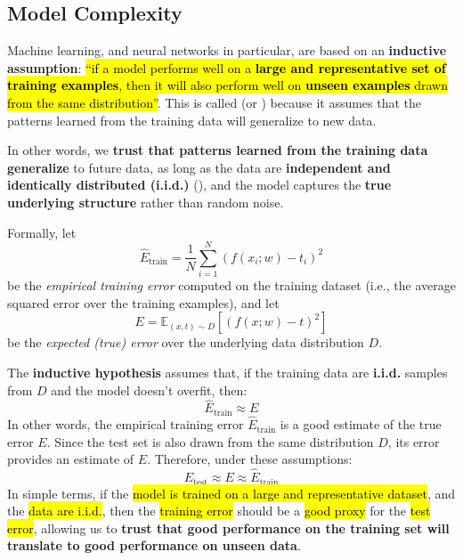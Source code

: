 \subsection{Model Complexity}\label{sec:nn-model-complexity}

Machine learning, and neural networks in particular, are based on an \textbf{inductive assumption}: \hl{``if a model performs well on a \textbf{large and representative set of training examples}, then it will also perform well on \textbf{unseen examples} drawn from the same distribution''}. This is called  (or ) because it assumes that the patterns learned from the training data will generalize to new data.\label{def:inductive-hypothesis}

\highspace
In other words, we \textbf{trust that patterns learned from the training data generalize} to future data, as long as the data are \textbf{independent and identically distributed (i.i.d.)} (), and the model captures the \textbf{true underlying structure} rather than random noise.

\highspace
Formally, let
\begin{equation*}
    \hat{E}_{\text{train}} =
    \frac{1}{N} \sum_{i=1}^{N}
    \left(f(x_i; w) - t_i\right)^2
\end{equation*}
be the \emph{empirical training error} computed on the training dataset (i.e., the average squared error over the training examples), and let
\begin{equation*}
    E =
    \mathbb{E}_{(x,t)\sim D}
    \left[\left(f(x; w) - t\right)^2\right]
\end{equation*}
be the \emph{expected (true) error} over the underlying data distribution $D$.

\highspace
The \textbf{inductive hypothesis} assumes that, if the training data are \textbf{i.i.d.} samples from $D$ and the model doesn't overfit, then:
\begin{equation*}
    \hat{E}_{\text{train}} \approx E
\end{equation*}
In other words, the empirical training error $\hat{E}_{\text{train}}$ is a good estimate of the true error $E$. Since the test set is also drawn from the same distribution $D$, its error provides an estimate of $E$. Therefore, under these assumptions:
\begin{equation*}
    E_{\text{test}} \approx E \approx \hat{E}_{\text{train}}
\end{equation*}
In simple terms, if the \hl{model is trained on a large and representative dataset}, and the \hl{data are i.i.d.}, then the \hl{training error} should be a \hl{good proxy} for the \hl{test error}, allowing us to \textbf{trust that good performance on the training set will translate to good performance on unseen data}.

